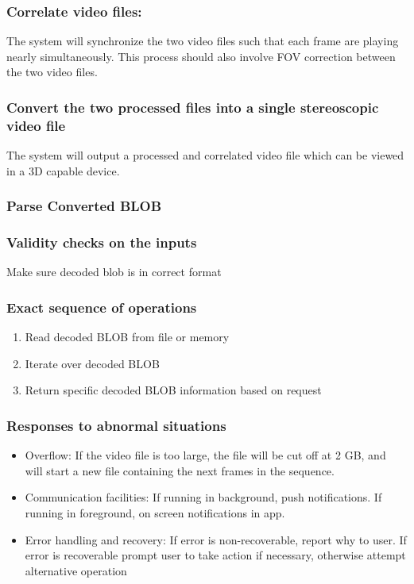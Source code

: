 \documentclass[10pt,letterpaper,onecolumn]{article}
\begin{document}
\subsubsection*{Correlate video files: }
The system will synchronize the two video files such that each frame are playing nearly simultaneously. This process should also involve FOV correction between the two video files.
\subsubsection*{Convert the two processed files into a single stereoscopic video file}
The system will output a processed and correlated video file which can be viewed in a 3D capable device.

\subsubsection{Parse Converted BLOB}
\subsubsection*{Validity checks on the inputs}
Make sure decoded blob is in correct format
\subsubsection*{Exact sequence of operations}
\begin{enumerate}
  \item Read decoded BLOB from file or memory
  \item Iterate over decoded BLOB
  \item Return specific decoded BLOB information based on request
\end{enumerate}
\subsubsection*{Responses to abnormal situations}
\begin{itemize}
  \item Overflow: If the video file is too large, the file will be cut off at 2 GB, and will start a new file containing the next frames in the sequence.
  \item Communication facilities: If running in background, push notifications. If running in foreground, on screen notifications in app.
  \item Error handling and recovery: If error is non-recoverable, report why to user. If error is recoverable prompt user to take action if necessary, otherwise attempt alternative operation
\end{itemize}
\end{document}
